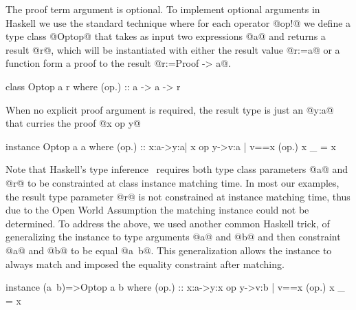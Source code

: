 %
The proof term argument is optional.
To implement optional arguments in Haskell we use the standard technique
where for each operator @op!@ we define a type class @Optop@
that takes as input two expressions @a@ and returns a result @r@,
which will be instantiated with either the result value @r:=a@
or a function form a proof to the result @r:=Proof ->  a@.
%
\begin{code}
  class Optop a r where
    (op.) :: a -> a -> r
\end{code}
%
When no explicit proof argument is required,
the result type is just an @y:a@ that curries the proof @x op y@
%
\begin{code}
  instance Optop a a where
  (op.) :: x:a->y:{a| x op y}->{v:a | v==x }
  (op.) x _ = x
\end{code}
%
Note that Haskell's type inference~\citep{Sulzmann06}
requires both type class parameters @a@ and @r@ to be constrainted at class instance
matching time.
%
In most our examples, the result type parameter @r@ is not constrained
at instance matching time, thus
due to the Open World Assumption
the matching instance could not be determined.
%
To address the above, we used another common Haskell trick,
of generalizing the instance to type arguments @a@ and @b@ and then
constraint @a@ and @b@ to be equal @a~b@.
%
This generalization allows the instance to always match and
imposed the equality constraint after matching.
%
\begin{code}
  instance (a~b)=>Optop a b where
  (op.) :: x:a->y:{x op y}->{v:b | v==x }
  (op.) x _ = x
\end{code}



